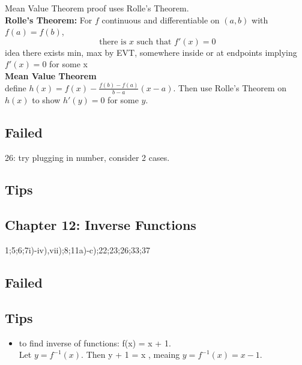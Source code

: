 \documentclass[a4paper, 12pt]{article}
\begin{document}
\medskip

Mean Value Theorem proof uses Rolle's Theorem.\\

\textbf{Rolle's Theorem:}
For $f$ continuous and differentiable on $(a, b)$ with $f(a) = f(b)$, 
$$\text{ there is $x$ such that } f'(x) = 0$$
\textcolor[gray]{0.5}{idea there exists min, max by EVT, somewhere inside or at endpoints implying $f'(x)=0$ for some x}\\

\textbf{Mean Value Theorem}\\
\textcolor[gray]{0.5}{define $h(x) = f(x) - \frac{f(b) - f(a)}{b-a} (x-a)$. Then use Rolle's Theorem on $h(x)$ to show $h'(y) = 0$ for some $y$.}

\subsection*{Failed}
26: try plugging in number, consider 2 cases.

\subsection*{Tips}


\subsection*{Chapter 12: Inverse Functions}
1;5;6;7i)-iv),vii);8;11a)-c);22;23;26;33;37


\subsection*{Failed}

\subsection*{Tips}
\begin{itemize}
    \item to find inverse of functions: f(x) = x + 1. \\
    Let $y = f^{-1}(x)$. Then y + 1 = x , meaing $y =  f^{-1}(x) =  x-1$.
\end{itemize}




\newpage
\end{document}

